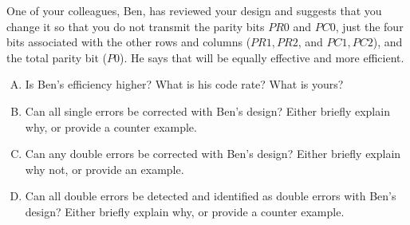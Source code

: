 \documentclass[jou]{apa6}
\begin{document}
One of your colleagues, Ben, has reviewed your design and suggests that you change it so that
you do not transmit the parity bits $PR0$ and $PC0$, just the four bits 
associated with the other rows and columns
($PR1,PR2$, and $PC1,PC2$), and the total parity bit ($P0$). 
He says that will be equally effective and more efficient.
\begin{enumerate}[(A)]
\item Is Ben's efficiency higher? What is his code rate? What is yours?
\item Can all single errors be corrected with Ben's design? Either briefly explain why, or provide a
counter example.
\item Can any double errors be corrected with Ben's design? Either briefly explain why not, or provide
an example.
\item Can all double errors be detected and identified as double errors with Ben's design? Either briefly
explain why, or provide a counter example.
\end{enumerate}



\end{document}
